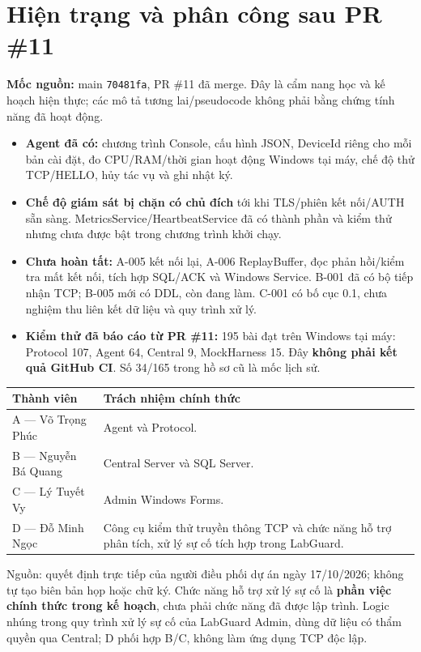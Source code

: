 
\section*{Hiện trạng và phân công sau PR \#11}
\begin{summarybox}
\textbf{Mốc nguồn:} main \texttt{70481fa}, PR \#11 đã merge. Đây là cẩm nang học và kế hoạch hiện thực; các mô tả tương lai/pseudocode không phải bằng chứng tính năng đã hoạt động.
\begin{itemize}[leftmargin=1.5em,itemsep=2pt]
\item \textbf{Agent đã có:} chương trình Console, cấu hình JSON, DeviceId riêng cho mỗi bản cài đặt, đo CPU/RAM/thời gian hoạt động Windows tại máy, chế độ thử TCP/HELLO, hủy tác vụ và ghi nhật ký.
\item \textbf{Chế độ giám sát bị chặn có chủ đích} tới khi TLS/phiên kết nối/AUTH sẵn sàng. MetricsService/HeartbeatService đã có thành phần và kiểm thử nhưng chưa được bật trong chương trình khởi chạy.
\item \textbf{Chưa hoàn tất:} A-005 kết nối lại, A-006 ReplayBuffer, đọc phản hồi/kiểm tra mất kết nối, tích hợp SQL/ACK và Windows Service. B-001 đã có bộ tiếp nhận TCP; B-005 mới có DDL, còn đang làm. C-001 có bố cục 0.1, chưa nghiệm thu liên kết dữ liệu và quy trình xử lý.
\item \textbf{Kiểm thử đã báo cáo từ PR \#11:} 195 bài đạt trên Windows tại máy: Protocol 107, Agent 64, Central 9, MockHarness 15. Đây \textbf{không phải kết quả GitHub CI}. Số 34/165 trong hồ sơ cũ là mốc lịch sử.
\end{itemize}
\end{summarybox}
\begin{center}
\small
\begin{tabularx}{\textwidth}{@{}lX@{}}
\toprule
\textbf{Thành viên} & \textbf{Trách nhiệm chính thức} \\
\midrule
A --- Võ Trọng Phúc & Agent và Protocol. \\
B --- Nguyễn Bá Quang & Central Server và SQL Server. \\
C --- Lý Tuyết Vy & Admin Windows Forms. \\
D --- Đỗ Minh Ngọc & Công cụ kiểm thử truyền thông TCP và chức năng hỗ trợ phân tích, xử lý sự cố tích hợp trong LabGuard. \\
\bottomrule
\end{tabularx}
\end{center}
Nguồn: quyết định trực tiếp của người điều phối dự án ngày 17/10/2026; không tự tạo biên bản họp hoặc chữ ký. Chức năng hỗ trợ xử lý sự cố là \textbf{phần việc chính thức trong kế hoạch}, chưa phải chức năng đã được lập trình. Logic nhúng trong quy trình xử lý sự cố của LabGuard Admin, dùng dữ liệu có thẩm quyền qua Central; D phối hợp B/C, không làm ứng dụng TCP độc lập.

